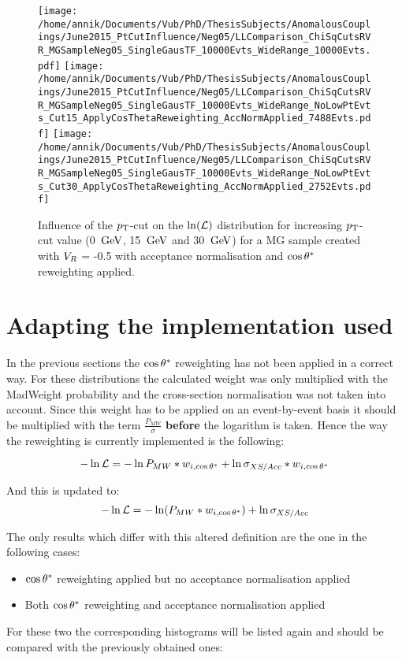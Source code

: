 \begin{figure}[h!t]
 \centering
 \texttt{[image: /home/annik/Documents/Vub/PhD/ThesisSubjects/AnomalousCouplings/June2015\_PtCutInfluence/Neg05/LLComparison\_ChiSqCutsRVR\_MGSampleNeg05\_SingleGausTF\_10000Evts\_WideRange\_10000Evts.pdf]}
 \texttt{[image: /home/annik/Documents/Vub/PhD/ThesisSubjects/AnomalousCouplings/June2015\_PtCutInfluence/Neg05/LLComparison\_ChiSqCutsRVR\_MGSampleNeg05\_SingleGausTF\_10000Evts\_WideRange\_NoLowPtEvts\_Cut15\_ApplyCosThetaReweighting\_AccNormApplied\_7488Evts.pdf]}
 \texttt{[image: /home/annik/Documents/Vub/PhD/ThesisSubjects/AnomalousCouplings/June2015\_PtCutInfluence/Neg05/LLComparison\_ChiSqCutsRVR\_MGSampleNeg05\_SingleGausTF\_10000Evts\_WideRange\_NoLowPtEvts\_Cut30\_ApplyCosThetaReweighting\_AccNormApplied\_2752Evts.pdf]}
 \caption{Influence of the $p_{\textrm T}$-cut on the $\ln(\mathcal{L})$ distribution for increasing $p_{\textrm T}$-cut value (0 $\, \mathrm{GeV}$, 15 $\, \mathrm{GeV}$ and 30 $\, \mathrm{GeV}$) for a MG sample created with $V_{R}$ = -0.5 with acceptance normalisation and $\cos \theta^{*}$ reweighting applied.}
 \label{fig::AccNormCosNeg05}
\end{figure}

\section{Adapting the implementation used}
In the previous sections the $\cos \theta^{*}$ reweighting has not been applied in a correct way. For these distributions the calculated weight was only multiplied with the MadWeight probability and the cross-section normalisation was not taken into account.
Since this weight has to be applied on an event-by-event basis it should be multiplied with the term $\frac{P_{MW}}{\sigma}$ \textbf{before} the logarithm is taken.
Hence the way the reweighting is currently implemented is the following:

\begin{equation}
 -\ln \mathcal{L} = - \ln P_{MW} * w_{i,\cos \theta^{*}} + \ln \sigma_{XS/Acc} * w_{i,\cos \theta^{*}}
\end{equation}

And this is updated to:
\begin{equation}
 -\ln \mathcal{L} = - \ln (P_{MW} * w_{i,\cos \theta^{*}}) + \ln \sigma_{XS/Acc}
\end{equation}

The only results which differ with this altered definition are the one in the following cases:
\begin{itemize}
 \item $\cos \theta^{*}$ reweighting applied but no acceptance normalisation applied
 \item Both $\cos \theta^{*}$ reweighting and acceptance normalisation applied
\end{itemize}
For these two the corresponding histograms will be listed again and should be compared with the previously obtained ones:

